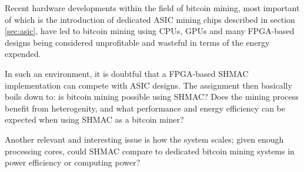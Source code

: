 Recent hardware developments within the field of bitcoin mining, most important of
which is the introduction of dedicated ASIC mining chips described in section \ref{sec:asic},
have led to bitcoin mining using CPUs, GPUs and many FPGA-based designs being considered
unprofitable and wasteful in terms of the energy expended.

In such an environment, it is doubtful that a FPGA-based SHMAC implementation can compete
with ASIC designs. The assignment then basically boils down to: is bitcoin mining possible using SHMAC?
Does the mining process benefit from heterogenity, and what performance and energy
efficiency can be expected when using SHMAC as a bitcoin miner?

Another relevant and interesting issue is how the system scales; given enough processing
cores, could SHMAC compare to dedicated bitcoin mining systems in power efficiency or
computing power?


